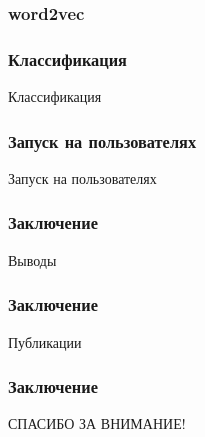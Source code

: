 \documentclass[compress,professionalfont]{beamer}
\begin{document}
\begin{frame}
\frametitle{word2vec}

\end{frame}

\begin{frame}
\frametitle{Классификация}

\begin{center}
Классификация
\end{center}

\end{frame}

\begin{frame}
\frametitle{Запуск на пользователях}

\begin{center}
Запуск на пользователях
\end{center}

\end{frame}

\begin{frame}
\frametitle{Заключение}

\begin{center}
Выводы
\end{center}

\end{frame}

\begin{frame}
\frametitle{Заключение}

Публикации
\begin{center}

\end{center}

\end{frame}

\begin{frame}

\frametitle{Заключение}

\begin{center}
СПАСИБО ЗА ВНИМАНИЕ!
\end{center}

\end{frame}
\end{document}
